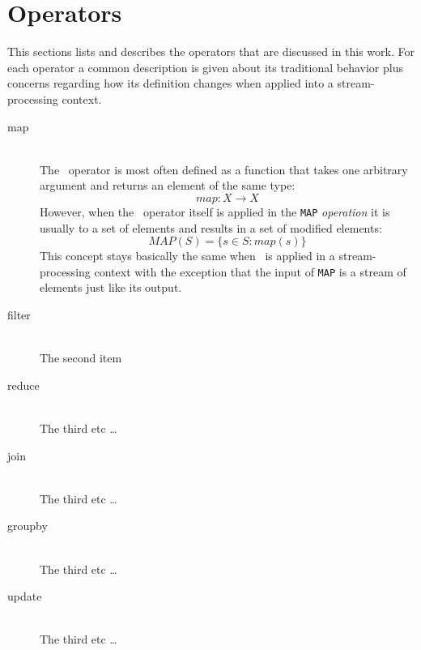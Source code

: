 \section{Operators}
\label{sect:operators}
This sections lists and describes the operators that are discussed in this work.
For each operator a common description is given about its traditional behavior plus concerns regarding how its definition changes when applied into a stream-processing context.
\begin{description}
  \item[map] \hfill \\
  The \map\ operator is most often defined as a function that takes one arbitrary argument and returns an element of the same type:
	$$map:X\rightarrow X$$
	However, when the \map\ operator itself is applied in the \texttt{MAP} \textsl{operation} it is usually to a set of elements and results in a set of modified elements:
	$$MAP\left(S\right)=\{s\in S : map(s)\}$$
	This concept stays basically the same when \map\ is applied in a stream-processing context with the exception that the input of \texttt{MAP} is a stream of elements just like its output.
  \item[filter] \hfill \\
  The second item
  \item[reduce] \hfill \\
  The third etc \ldots
	\item[join] \hfill \\
  The third etc \ldots
	\item[groupby] \hfill \\
  The third etc \ldots
	\item[update] \hfill \\
  The third etc \ldots
\end{description}

